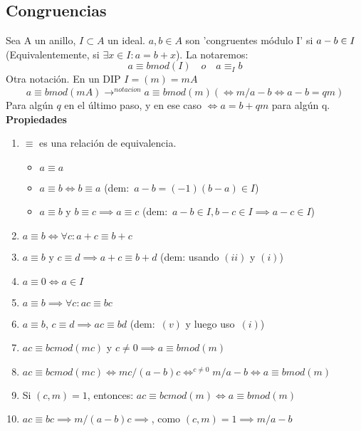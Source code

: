 \documentclass[11pt, a4paper, titlepage]{article}
\makeatletter
\renewenvironment{proof}[1][\proofname] {\vspace{-15pt}\par\pushQED{\qed}\normalfont\topsep6\p@\@plus6\p@\relax\trivlist\item[\hskip\labelsep\it#1\@addpunct{.}]\ignorespaces}{\popQED\endtrivlist\@endpefalse}
\theoremstyle{theorem-style}
\theoremstyle{definition-style}
\theoremstyle{remark-style}
\theoremstyle{example-style}
\newenvironment{nlist}
{\begin{enumerate}
\renewcommand\labelenumi{(\emph{\roman{enumi})}}}
{\end{enumerate}}
\makeatother
\begin{document}
\subsection{ Congruencias}
Sea A un anillo, $I \subset A$ un ideal. $a,b \in A$ son 'congruentes módulo I' si $a-b \in I\\$(Equivalentemente, si $\exists x \in I : a = b+x$). La notaremos:
\[
a \equiv b mod(I) \quad o \quad a \equiv_ I b
\]
Otra notación. En un DIP $I = (m) = mA$
\[
a \equiv bmod(mA) \to^{notacion} a \equiv b mod(m) ( \iff m/a-b \iff a-b = qm)
\]
Para algún $q$ en el último paso, y en ese caso $\iff a = b+qm$ para algún q.\\

\textbf{Propiedades}

\begin{nlist}
	\item $\equiv$ es una relación de equivalencia.
	\begin{itemize}
		\item $a \equiv a$
		\item $a \equiv b \iff b \equiv a$ (dem:\ $a-b = (-1)(b-a) \in I$)
		\item $a \equiv b$ y $b \equiv c \implies a \equiv c$ (dem:\ $a-b\in I, b-c \in I \implies a-c \in I$)
	\end{itemize}
	
	\item $a\equiv b \iff \forall c : a+ c \equiv b + c$
	\item $a\equiv b$ y $c \equiv d \implies a+c \equiv b + d$ (dem: usando $(ii)$ y $(i)$)
	\item $a \equiv 0 \iff a \in I$
	\item $a \equiv b \implies \forall c : ac  \equiv bc$
	\item $a \equiv b$, $c \equiv d \implies ac \equiv bd$ (dem:\ $(v)$ y luego uso\ $(i)$)
	\item $ac \equiv bc mod(mc) $ y $c \ne 0 \implies a\equiv b mod(m)$\\

\begin{proof}
	$ac \equiv bc mod(mc) \iff mc/(a-b)c \iff^{c\ne 0} m/a-b \iff a\equiv b mod(m)$
\end{proof}
	\item Si $(c,m) = 1$, entonces: $ac\equiv bcmod(m) \iff a \equiv bmod(m)$\\
	\begin{proof}
	$ac\equiv bc \implies m/(a-b)c \implies$, como $(c,m) = 1 \implies m/a-b$
\end{proof}
	
	
\end{nlist}
\end{document}
